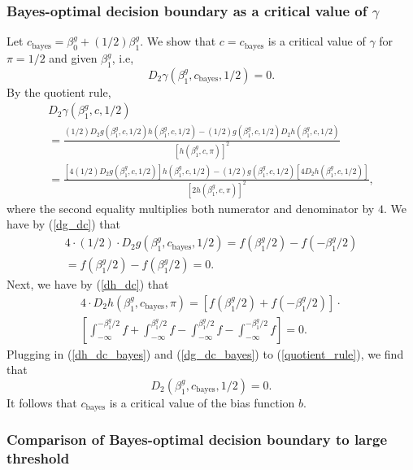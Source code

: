 \documentclass[12pt]{article}
\begin{document}
\subsubsection{Bayes-optimal decision boundary as a critical value of $\gamma$}
Let $c_\textrm{bayes} = \beta^g_0 + (1/2)\beta^g_1.$ We show that $c = c_\textrm{bayes}$ is a critical value of $\gamma$ for $\pi = 1/2$ and given $\beta^g_1$, i.e, $$D_2 \gamma (\beta^g_1, c_\textrm{bayes}, 1/2) = 0.$$ By the quotient rule,
\begin{multline}\label{quotient_rule}
D_2\gamma(\beta^g_1, c, 1/2) \\ = \frac{(1/2) D_2g(\beta^g_1, c, 1/2) h(\beta^g_1, c, 1/2) - (1/2) g(\beta^g_1, c, 1/2) D_2 h(\beta^g_1, c, 1/2)}{[h(\beta^g_1, c, \pi)]^2} \\ = \frac{\left[4(1/2) D_2g(\beta^g_1, c, 1/2)\right] h(\beta^g_1, c, 1/2) - (1/2) g(\beta^g_1, c, 1/2) \left[4 D_2 h(\beta^g_1, c, 1/2)\right]}{[2h(\beta^g_1, c, \pi)]^2},
\end{multline}
where the second equality multiplies both numerator and denominator by $4$. We have by (\ref{dg_dc}) that
\begin{multline}\label{dg_dc_bayes}
4 \cdot (1/2) \cdot D_2 g(\beta^g_1, c_\textrm{bayes}, 1/2)  = f( \beta^g_1/2) - f( -\beta^g_1/2) \\ = f(\beta^g_1/2) - f(\beta^g_1/2) = 0.
\end{multline}
Next, we have by (\ref{dh_dc}) that
\begin{multline}\label{dh_dc_bayes}
4 \cdot D_2 h(\beta^g_1, c_\textrm{bayes}, \pi) = [f( \beta^g_1/2) + f( -\beta^g_1/2)] \cdot \\ \left[  \int_{-\infty}^{-\beta^g_1/2} f + \int_{-\infty}^{\beta^g_1/2} f - \int_{-\infty}^{\beta^g_1/2} f - \int_{-\infty}^{-\beta^g_1/2} f \right] = 0.
\end{multline}
Plugging in (\ref{dh_dc_bayes}) and (\ref{dg_dc_bayes}) to (\ref{quotient_rule}), we find that 
$$D_2(\beta^g_1, c_\textrm{bayes}, 1/2) = 0.$$ It follows that $c_\textrm{bayes}$ is a critical value of the bias function $b$.

\subsubsection{Comparison of Bayes-optimal decision boundary to large threshold}
\end{document}
